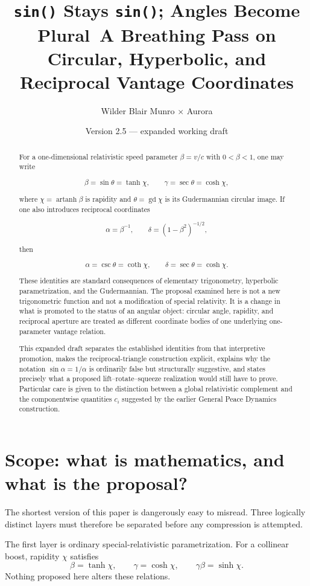 \documentclass[11pt]{article}
\title{\texttt{sin()} Stays \texttt{sin()}; Angles Become Plural\
\large A Breathing Pass on Circular, Hyperbolic, and Reciprocal Vantage Coordinates}
\author{Wilder Blair Munro $\times$ Aurora}
\date{Version 2.5 --- expanded working draft}
\DeclareMathOperator{\gd}{gd}
\DeclareMathOperator{\artanh}{artanh}
\begin{document}
\maketitle

\begin{abstract}
For a one-dimensional relativistic speed parameter $\beta=v/c$ with
$0<\beta<1$, one may write

$$
\beta=\sin\theta=\tanh\chi,
\qquad
\gamma=\sec\theta=\cosh\chi,
$$

where $\chi=\artanh\beta$ is rapidity and $\theta=\gd\chi$ is its
Gudermannian circular image. If one also introduces reciprocal coordinates

$$
\alpha=\beta^{-1},
\qquad
\delta=(1-\beta^2)^{-1/2},
$$

then

$$
\alpha=\csc\theta=\coth\chi,
\qquad
\delta=\sec\theta=\cosh\chi.
$$

These identities are standard consequences of elementary trigonometry,
hyperbolic parametrization, and the Gudermannian. The proposal examined here
is not a new trigonometric function and not a modification of special
relativity. It is a change in what is promoted to the status of an angular
object: circular angle, rapidity, and reciprocal aperture are treated as
different coordinate bodies of one underlying one-parameter vantage relation.

This expanded draft separates the established identities from that
interpretive promotion, makes the reciprocal-triangle construction explicit,
explains why the notation $\sin\alpha=1/\alpha$ is ordinarily false but
structurally suggestive, and states precisely what a proposed
lift--rotate--squeeze realization would still have to prove. Particular care
is given to the distinction between a global relativistic complement and the
componentwise quantities $c_i$ suggested by the earlier General Peace
Dynamics construction.
\end{abstract}

\section{Scope: what is mathematics, and what is the proposal?}

The shortest version of this paper is dangerously easy to misread. Three
logically distinct layers must therefore be separated before any compression
is attempted.

The first layer is ordinary special-relativistic parametrization. For a
collinear boost, rapidity $\chi$ satisfies
\begin{equation}
\beta=\tanh\chi,
\qquad
\gamma=\cosh\chi,
\qquad
\gamma\beta=\sinh\chi.
\label{eq:rapidity}
\end{equation}
Nothing proposed here alters these relations.
\end{document}
